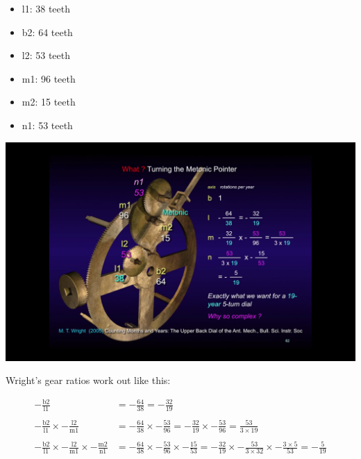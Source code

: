 \documentclass[11pt, oneside]{article}   	%
\theoremstyle{definition}
\begin{document}
\bigskip
\bigskip
\begin{minipage}[c]{0.45\textwidth}
  \begin{itemize}
      \item l1: 38 teeth
      \item b2: 64 teeth
      \item l2: 53 teeth
      \item m1: 96 teeth
      \item m2: 15 teeth
      \item n1: 53 teeth
  \end{itemize}
\end{minipage}
\hfill
\begin{minipage}[c]{0.60\textwidth}
  \includegraphics[width=\textwidth,cfbox=red]{images/turning_the_metonic_pointer_wright.png}
\end{minipage}

\bigskip
\bigskip
\noindent
Wright's  gear ratios work out like this:

\bigskip
\begin{equation*}
\begin{array}{lllll}
- \frac{\text{b2}}{\text{l1}} &= - \frac{64}{38} = - \frac{32}{19}                                                                                                                                                              \\ \\
-\frac{\text{b2}}{\text{l1}} \times -\frac{\text{l2}}{\text{m1}} &= - \frac{64}{38} \times - \frac{53}{96} = - \frac{32}{19} \times - \frac{53}{96} = \frac{53}{3 \times 19}  \\ \\
- \frac{\text{b2}}{\text{l1}} \times -\frac{\text{l2}}{\text{m1}} \times - \frac{\text{m2}}{\text{n1}} &= - \frac{64}{38} \times - \frac{53}{96} \times - \frac{15}{53} 
=  -\frac{32}{19} \times - \frac{53}{3 \times 32} \times - \frac{3 \times 5}{53} = - \frac{5}{19}
\end{array}
\end{equation*}
\end{document}
